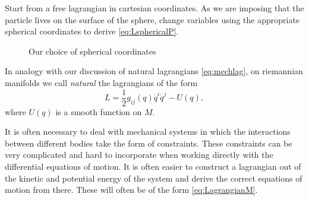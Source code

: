 \documentclass[english,fontsize=11pt,paper=a5,oneside]{scrbook}
\theoremstyle{definition}
\newenvironment{remark}
  {\pushQED{\qed}\renewcommand{\qedsymbol}{$\lozenge$}\remarkx}
  {\popQED\endremarkx}
\newenvironment{exercise}
  {\pushQED{\qed}\renewcommand{\qedsymbol}{$\maltese$}\exercisex}
  {\popQED\endexercisex}
\begin{document}
\begin{exercise}
    Start from a free lagrangian in cartesian coordinates.
    As we are imposing that the particle lives on the surface of the sphere, change variables using the appropriate spherical coordinates to derive \eqref{eq:LsphericalP}.
\end{exercise}

\begin{figure}[ht]
    \centering
    \caption{Our choice of spherical coordinates}
    \label{fig:sphcoords}
\end{figure}

In analogy with our discussion of natural lagrangians \eqref{eq:mechlag}, on riemannian manifolds we call \emph{natural} the lagrangians of the form
\begin{equation}\label{eq:LagrangianM}
    L = \frac 12 g_{ij}(q)\dot q^i \dot q^j - U(q),
\end{equation}
where $U(q)$ is a smooth function on $M$.

\begin{remark}
    It  is  often  necessary  to  deal  with  mechanical  systems  in  which the interactions between different bodies take the form of constraints.
    These constraints can  be  very  complicated  and  hard  to  incorporate  when  working directly  with  the differential  equations  of  motion.
    It  is  often  easier  to  construct  a  lagrangian out of the kinetic and potential energy of the system and derive the correct equations of motion from there.
    These will often be of the form \eqref{eq:LagrangianM}.
\end{remark}
\end{document}
